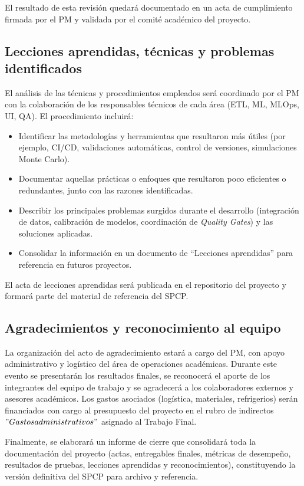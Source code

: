 \documentclass[12pt]
{charter}
\begin{document}
El resultado de esta revisión quedará documentado en un acta de cumplimiento firmada por el PM y validada por el comité académico del proyecto.

\subsection{Lecciones aprendidas, técnicas y problemas identificados}
El análisis de las técnicas y procedimientos empleados será coordinado por el PM con la colaboración de los responsables técnicos de cada área (ETL, ML, MLOps, UI, QA).  
El procedimiento incluirá:
\begin{itemize}
  \item Identificar las metodologías y herramientas que resultaron más útiles (por ejemplo, CI/CD, validaciones automáticas, control de versiones, simulaciones Monte Carlo).
  \item Documentar aquellas prácticas o enfoques que resultaron poco eficientes o redundantes, junto con las razones identificadas.
  \item Describir los principales problemas surgidos durante el desarrollo (integración de datos, calibración de modelos, coordinación de \textit{Quality Gates}) y las soluciones aplicadas.
  \item Consolidar la información en un documento de “Lecciones aprendidas” para referencia en futuros proyectos.
\end{itemize}

El acta de lecciones aprendidas será publicada en el repositorio del proyecto y formará parte del material de referencia del SPCP.

\subsection{Agradecimientos y reconocimiento al equipo}
La organización del acto de agradecimiento estará a cargo del PM, con apoyo administrativo y logístico del área de operaciones académicas.  
Durante este evento se presentarán los resultados finales, se reconocerá el aporte de los integrantes del equipo de trabajo y se agradecerá a los colaboradores externos y asesores académicos.  
Los gastos asociados (logística, materiales, refrigerios) serán financiados con cargo al presupuesto del proyecto en el rubro de indirectos $"Gastos administrativos"$ asignado al Trabajo Final.

Finalmente, se elaborará un informe de cierre que consolidará toda la documentación del proyecto (actas, entregables finales, métricas de desempeño, resultados de pruebas, lecciones aprendidas y reconocimientos), constituyendo la versión definitiva del SPCP para archivo y referencia.
\end{document}
